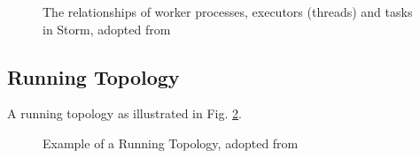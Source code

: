 \documentclass[9pt,twocolumn,twoside]{styles/osajnl}
\begin{document}
\begin{figure}[htbp]
	\centering
	\caption{The relationships of worker processes, executors
          (threads) and tasks in Storm, adopted from
          \cite{www-noll2012-parallelismofstormtopology} }
	\label{fig:Storm_worker-processes_executors_tasks}
\end{figure}


\subsection{Running Topology}
A running topology as illustrated in
Fig. \ref{fig:Storm_example_of_a_running_topology}.

\begin{figure}[htbp]
	\centering
	\caption{Example of a Running Topology, adopted from
	\cite{www-noll2012-parallelismofstormtopology} }
	\label{fig:Storm_example_of_a_running_topology}
\end{figure}
\end{document}
